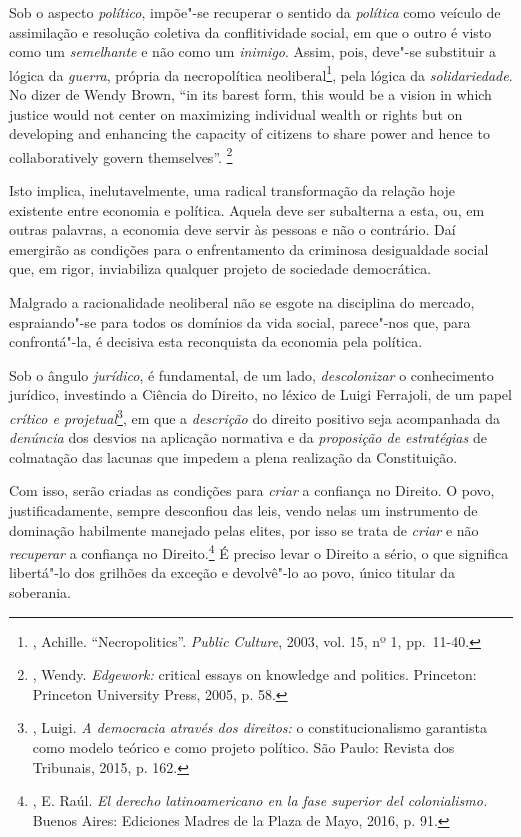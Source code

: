 Sob o aspecto \emph{político}, impõe"-se recuperar o sentido da
\emph{política} como veículo de assimilação e resolução coletiva da
conflitividade social, em que o outro é visto como um \emph{semelhante}
e não como um \emph{inimigo}. Assim, pois, deve"-se substituir a lógica
da \emph{guerra}, própria da necropolítica neoliberal\footnote{,
  Achille. ``Necropolitics''. \emph{Public} \emph{Culture}, 2003, vol.
  15, nº 1, pp.~11-40.}, pela lógica da \emph{solidariedade}. No dizer
de Wendy Brown, ``in its barest form, this would be a vision in which
justice would not center on maximizing individual wealth or rights but
on developing and enhancing the capacity of citizens to share power and
hence to collaboratively govern themselves''. \footnote{, Wendy.
  \emph{Edgework:} critical essays on knowledge and politics. Princeton:
  Princeton University Press, 2005, p. 58.}

Isto implica, inelutavelmente, uma radical transformação da relação hoje
existente entre economia e política. Aquela deve ser subalterna a esta,
ou, em outras palavras, a economia deve servir às pessoas e não o
contrário. Daí emergirão as condições para o enfrentamento da criminosa
desigualdade social que, em rigor, inviabiliza qualquer projeto de
sociedade democrática.

Malgrado a racionalidade neoliberal não se esgote na disciplina do
mercado, espraiando"-se para todos os domínios da vida social, parece"-nos
que, para confrontá"-la, é decisiva esta reconquista da economia pela
política.

Sob o ângulo \emph{jurídico}, é fundamental, de um lado,
\emph{descolonizar} o conhecimento jurídico, investindo a Ciência do
Direito, no léxico de Luigi Ferrajoli, de um papel \emph{crítico e
projetual}\footnote{, Luigi. \emph{A democracia através dos
  direitos:} o constitucionalismo garantista como modelo teórico e como
  projeto político. São Paulo: Revista dos Tribunais, 2015, p. 162.}, em
que a \emph{descrição} do direito positivo seja acompanhada da
\emph{denúncia} dos desvios na aplicação normativa e da \emph{proposição
de estratégias} de colmatação das lacunas que impedem a plena realização
da Constituição.

Com isso, serão criadas as condições para \emph{criar} a confiança no
Direito. O povo, justificadamente, sempre desconfiou das leis, vendo
nelas um instrumento de dominação habilmente manejado pelas elites, por
isso se trata de \emph{criar} e não \emph{recuperar} a confiança no
Direito.\footnote{, E. Raúl. \emph{El derecho latinoamericano
  en la fase superior del colonialismo.} Buenos Aires: Ediciones Madres
  de la Plaza de Mayo, 2016, p. 91.} É preciso levar o Direito a sério,
o que significa libertá"-lo dos grilhões da exceção e devolvê"-lo ao povo,
único titular da soberania.
